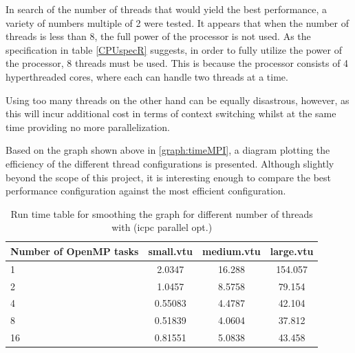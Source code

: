 \documentclass[fleqn,11pt]{SelfArx} %
\theoremstyle{definition}
\begin{document}
In search of the number of threads that would yield the best performance, a variety of numbers multiple of 2 were tested. It appears that when the number of threads is less than 8, the full power of the processor is not used. As the specification in table \ref{CPUspecR} suggests, in order to fully utilize the power of the processor, 8 threads must be used. This is because the processor consists of 4 hyperthreaded cores, where each can handle two threads at a time.

Using too many threads on the other hand can be equally disastrous, however, as this will incur additional cost in terms of context switching whilst at the same time providing no more parallelization.

Based on the graph shown above in \ref{graph:timeMPI}, a diagram plotting the efficiency of the different thread configurations is presented. Although slightly beyond the scope of this project, it is interesting enough to compare the best performance configuration against the most efficient configuration.

\begin{table}[!h]
\centering
\begin{tabular}{l|c|c|c}
Number of OpenMP tasks & small.vtu & medium.vtu & large.vtu \\  \hline
1 & 2.0347 & 16.288 & 154.057 \\
2 & 1.0457 & 8.5758 & 79.154 \\
4 & 0.55083 & 4.4787 & 42.104 \\
8 & 0.51839 & 4.0604 & 37.812 \\
16 & 0.81551 & 5.0838 & 43.458 \\
\end{tabular}
\caption{Run time table for smoothing the graph for different number of threads with (icpc parallel opt.)}
\end{table}
\end{document}
